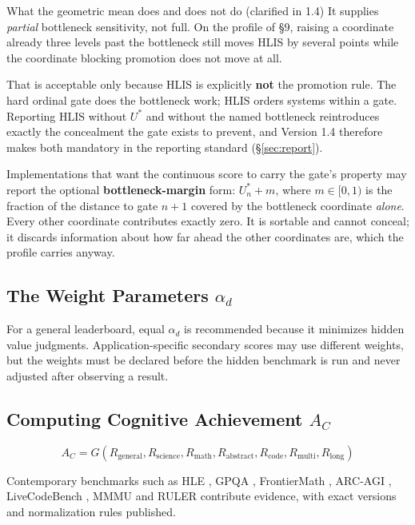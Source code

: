 \documentclass[11pt]{article}
\theoremstyle{definition}
\begin{document}
\begin{cautionbox}{What the geometric mean does and does not do (clarified in 1.4)}
It supplies \emph{partial} bottleneck sensitivity, not full. On the profile of \S9, raising a coordinate already three levels past the bottleneck still moves HLIS by several points while the coordinate blocking promotion does not move at all.

That is acceptable only because HLIS is explicitly \textbf{not} the promotion rule. The hard ordinal gate does the bottleneck work; HLIS orders systems within a gate. Reporting HLIS without $U^{*}$ and without the named bottleneck reintroduces exactly the concealment the gate exists to prevent, and Version 1.4 therefore makes both mandatory in the reporting standard (\S\ref{sec:report}).

Implementations that want the continuous score to carry the gate's property may report the optional \textbf{bottleneck-margin} form: $U^{*}_n + m$, where $m \in [0,1)$ is the fraction of the distance to gate $n{+}1$ covered by the bottleneck coordinate \emph{alone}. Every other coordinate contributes exactly zero. It is sortable and cannot conceal; it discards information about how far ahead the other coordinates are, which the profile carries anyway.
\end{cautionbox}

\subsection{The Weight Parameters $\alpha_d$}

\sloppy For a general leaderboard, equal $\alpha_d$ is recommended because it minimizes hidden value judgments. Application-specific secondary scores may use different weights, but the weights must be declared before the hidden benchmark is run and never adjusted after observing a result.

\subsection{Computing Cognitive Achievement $A_C$}

\begin{equation}
A_C = G(R_{\text{general}}, R_{\text{science}}, R_{\text{math}}, R_{\text{abstract}}, R_{\text{code}}, R_{\text{multi}}, R_{\text{long}})
\end{equation}

Contemporary benchmarks such as HLE \citep{phan2025hle}, GPQA \citep{rein2023gpqa}, FrontierMath \citep{glazer2024frontiermath}, ARC-AGI \citep{arc2026}, LiveCodeBench \citep{jain2024livecodebench}, MMMU \citep{yue2023mmmu} and RULER \citep{hsieh2024ruler} contribute evidence, with exact versions and normalization rules published.
\end{document}
